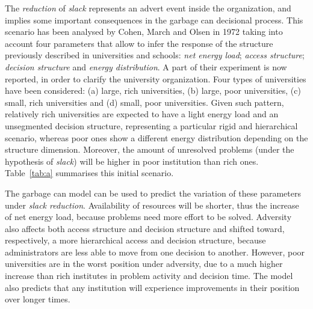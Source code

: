 The \textit{reduction} of \textit{slack} represents an advert event inside the organization, and implies some important consequences in the garbage can decisional process. This scenario has been analysed by Cohen, March and Olsen in 1972\cite{1} taking into account four parameters that allow to infer the response of the structure previously described in universities and schools: \textit{net energy load}; \textit{access structure}; \textit{decision structure} and \textit{energy distribution}. A part of their experiment is now reported, in order to clarify the university organization. Four types of universities have been considered: (a) large, rich universities, (b) large, poor universities, (c) small, rich universities and (d) small, poor universities. Given such pattern, relatively rich universities are expected to have a light energy load and an unsegmented decision structure, representing a particular rigid and hierarchical scenario, whereas poor ones show a different energy distribution depending on the structure dimension. Moreover, the amount of unresolved problems (under the hypothesis of \textit{slack}) will be higher in poor institution than rich ones. Table~\ref{tab:a} summarises this initial scenario.

\begin{table}
\centering
\caption{Results in pattern variation under slack reduction.}
\label{tab:a}
\end{table}

The garbage can model can be used to predict the variation of these parameters under \textit{slack reduction}. Availability of resources will be shorter, thus the increase of net energy load, because problems need more effort to be solved. Adversity also affects both access structure and decision structure and shifted toward, respectively, a more hierarchical access and decision structure, because administrators are less able to move from one decision to another. However, poor universities are in the worst position under adversity, due to a much higher increase than rich institutes in problem activity and decision time. The model also predicts that any institution will experience improvements in their position over longer times.

